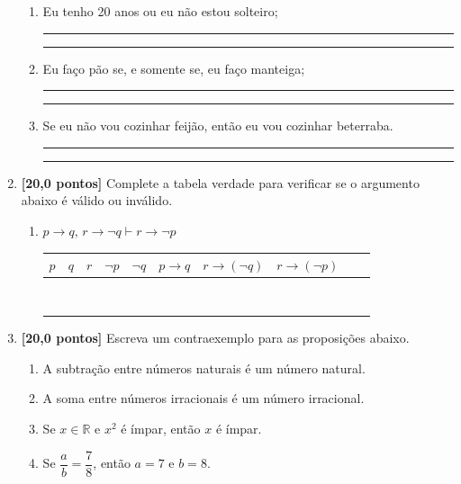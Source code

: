 \documentclass[12pt,a4paper]{article}
\begin{document}
\begin{enumerate}
\begin{enumerate}
      \item Eu tenho 20 anos ou eu não estou solteiro;

      \rule{\linewidth}{0.1mm}
      
      \rule{\linewidth}{0.1mm}

      \item Eu faço pão se, e somente se, eu faço manteiga;

      \rule{\linewidth}{0.1mm}
      
      \rule{\linewidth}{0.1mm}
      
      \item Se eu não vou cozinhar feijão, então eu vou cozinhar beterraba.

      \rule{\linewidth}{0.1mm}
      
      \rule{\linewidth}{0.1mm}
    \end{enumerate}

  \item \textbf{[20,0 pontos]} Complete a tabela verdade para verificar se o argumento abaixo é válido ou inválido.
    \begin{enumerate}
      \item $p\to q,\, r\to \lnot q \vdash r \to \lnot p$

    \begin{center}
      \begin{tabular}{|c|c|c|c|c|c|c|c|c|c|}
        \hline
        $p$ & $q$ & $r$ & $\lnot p$ & $\lnot q$ & 
        $p \rightarrow q$ & $r \rightarrow (\lnot q)$ & 
        $r \rightarrow (\lnot p)$\\ \hline
         & & & & & & & \\ \hline
         & & & & & & & \\ \hline
         & & & & & & & \\ \hline
         & & & & & & & \\ \hline
         & & & & & & & \\ \hline
         & & & & & & & \\ \hline
         & & & & & & & \\ \hline
         & & & & & & & \\ \hline
      \end{tabular}
    \end{center}

  \end{enumerate}

  \item \textbf{[20,0 pontos]} Escreva um contraexemplo para as proposições abaixo.
    \begin{enumerate}
      \item A subtração entre números naturais é um número natural.
      \item A soma entre números irracionais é um número irracional.
      \item Se $x\in\mathbb{R}$ e $x^2$ é ímpar, então $x$ é ímpar.
      \item Se $\dfrac{a}{b} = \dfrac{7}{8}$, então $a = 7$ e $b = 8$.
    \end{enumerate}
 

\end{enumerate}
\end{document}
